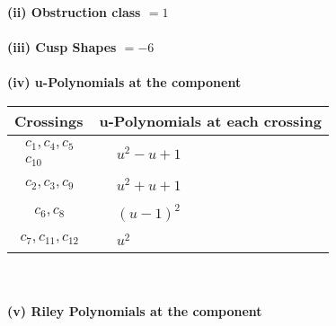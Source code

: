 \documentclass[1p]{elsarticle_modified}
\theoremstyle{definition}
\begin{document}
\flushleft \textbf{(ii) Obstruction class $= 1$}\\~\\
\flushleft \textbf{(iii) Cusp Shapes $= -6$}\\~\\
\newpage\renewcommand{\arraystretch}{1}
\flushleft \textbf{(iv) u-Polynomials at the component}\newline \\
\begin{tabular}{m{50pt}|m{274pt}}
Crossings & \hspace{64pt}u-Polynomials at each crossing \\
\hline $$\begin{aligned}c_{1},c_{4},c_{5}\\c_{10}\end{aligned}$$&$\begin{aligned}
&u^2- u+1
\end{aligned}$\\
\hline $$\begin{aligned}c_{2},c_{3},c_{9}\end{aligned}$$&$\begin{aligned}
&u^2+u+1
\end{aligned}$\\
\hline $$\begin{aligned}c_{6},c_{8}\end{aligned}$$&$\begin{aligned}
&(u-1)^2
\end{aligned}$\\
\hline $$\begin{aligned}c_{7},c_{11},c_{12}\end{aligned}$$&$\begin{aligned}
&u^2
\end{aligned}$\\
\hline
\end{tabular}\\~\\
\newpage\renewcommand{\arraystretch}{1}
\flushleft \textbf{(v) Riley Polynomials at the component}\newline \\
\end{document}
